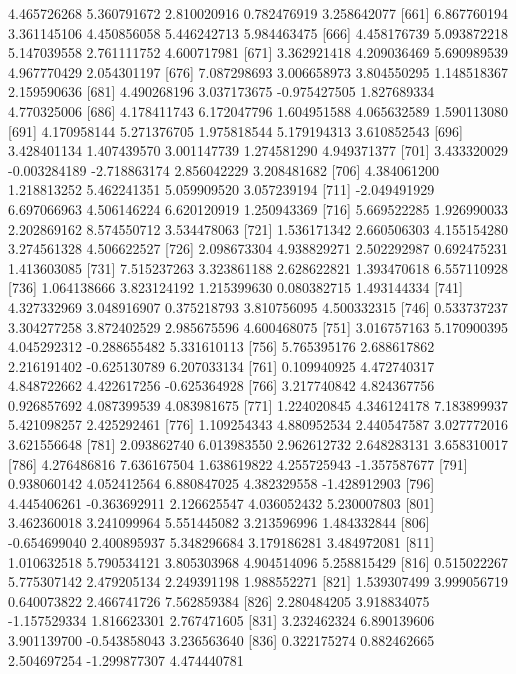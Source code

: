 \documentclass[12pt]{article}
\begin{document}
\begin{Schunk}
\begin{Soutput}
 [656]  4.465726268  5.360791672  2.810020916  0.782476919  3.258642077
 [661]  6.867760194  3.361145106  4.450856058  5.446242713  5.984463475
 [666]  4.458176739  5.093872218  5.147039558  2.761111752  4.600717981
 [671]  3.362921418  4.209036469  5.690989539  4.967770429  2.054301197
 [676]  7.087298693  3.006658973  3.804550295  1.148518367  2.159590636
 [681]  4.490268196  3.037173675 -0.975427505  1.827689334  4.770325006
 [686]  4.178411743  6.172047796  1.604951588  4.065632589  1.590113080
 [691]  4.170958144  5.271376705  1.975818544  5.179194313  3.610852543
 [696]  3.428401134  1.407439570  3.001147739  1.274581290  4.949371377
 [701]  3.433320029 -0.003284189 -2.718863174  2.856042229  3.208481682
 [706]  4.384061200  1.218813252  5.462241351  5.059909520  3.057239194
 [711] -2.049491929  6.697066963  4.506146224  6.620120919  1.250943369
 [716]  5.669522285  1.926990033  2.202869162  8.574550712  3.534478063
 [721]  1.536171342  2.660506303  4.155154280  3.274561328  4.506622527
 [726]  2.098673304  4.938829271  2.502292987  0.692475231  1.413603085
 [731]  7.515237263  3.323861188  2.628622821  1.393470618  6.557110928
 [736]  1.064138666  3.823124192  1.215399630  0.080382715  1.493144334
 [741]  4.327332969  3.048916907  0.375218793  3.810756095  4.500332315
 [746]  0.533737237  3.304277258  3.872402529  2.985675596  4.600468075
 [751]  3.016757163  5.170900395  4.045292312 -0.288655482  5.331610113
 [756]  5.765395176  2.688617862  2.216191402 -0.625130789  6.207033134
 [761]  0.109940925  4.472740317  4.848722662  4.422617256 -0.625364928
 [766]  3.217740842  4.824367756  0.926857692  4.087399539  4.083981675
 [771]  1.224020845  4.346124178  7.183899937  5.421098257  2.425292461
 [776]  1.109254343  4.880952534  2.440547587  3.027772016  3.621556648
 [781]  2.093862740  6.013983550  2.962612732  2.648283131  3.658310017
 [786]  4.276486816  7.636167504  1.638619822  4.255725943 -1.357587677
 [791]  0.938060142  4.052412564  6.880847025  4.382329558 -1.428912903
 [796]  4.445406261 -0.363692911  2.126625547  4.036052432  5.230007803
 [801]  3.462360018  3.241099964  5.551445082  3.213596996  1.484332844
 [806] -0.654699040  2.400895937  5.348296684  3.179186281  3.484972081
 [811]  1.010632518  5.790534121  3.805303968  4.904514096  5.258815429
 [816]  0.515022267  5.775307142  2.479205134  2.249391198  1.988552271
 [821]  1.539307499  3.999056719  0.640073822  2.466741726  7.562859384
 [826]  2.280484205  3.918834075 -1.157529334  1.816623301  2.767471605
 [831]  3.232462324  6.890139606  3.901139700 -0.543858043  3.236563640
 [836]  0.322175274  0.882462665  2.504697254 -1.299877307  4.474440781

\end{Soutput}
\end{Schunk}
\end{document}
